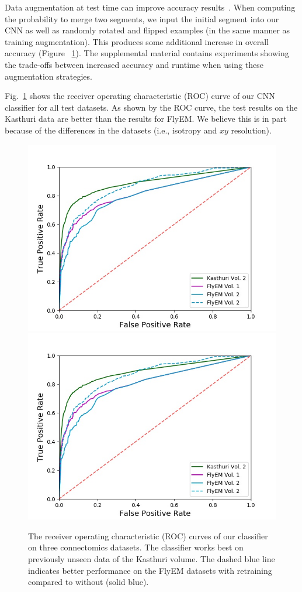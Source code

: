 Data augmentation at test time can improve accuracy results~\cite{zeng2017deepem3d,lee2017superhuman}.
When computing the probability to merge two segments, we input the initial segment into our CNN as well as  randomly rotated and flipped examples (in the same manner as training augmentation).
This produces some additional increase in overall accuracy (Figure ~\ref{fig:receiver-operating-characteristic}).
The supplemental material contains experiments showing the trade-offs between increased accuracy and runtime when using these augmentation strategies.

Fig.~\ref{fig:receiver-operating-characteristic} shows the receiver operating characteristic (ROC) curve of our CNN classifier for all test datasets.
As shown by the ROC curve, the test results on the Kasthuri data are better than the results for FlyEM.
We believe this is in part because of the differences in the datasets (i.e., isotropy and $xy$ resolution).



\begin{figure}
	\centering
	\includegraphics[width=0.45\linewidth]{./figures/receiver-operating-characteristic.jpg}		\includegraphics[width=0.45\linewidth]{./figures/receiver-operating-characteristic.jpg}
	\caption{The receiver operating characteristic (ROC) curves of our classifier on three connectomics datasets. The classifier works best on previously unseen data of the Kasthuri volume. The dashed blue line indicates better performance on the FlyEM datasets with retraining compared to without (solid blue).}
	\label{fig:receiver-operating-characteristic}
\end{figure}

